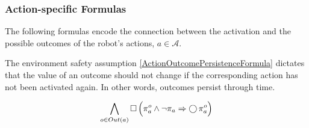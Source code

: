 
\subsubsection{Action-specific Formulas}

The following formulas encode the connection between the activation and the possible outcomes of the robot's actions, $a \in \mathcal{A}$.




The environment safety assumption \eqref{ActionOutcomePersistenceFormula} dictates that the value of an outcome should not change if the corresponding action has not been activated again. 
In other words, outcomes persist through time.

\begin{equation}\label{ActionOutcomePersistenceFormula}
	\bigwedge \limits_{o \in Out(a)} \operatorname{\Box} \Big( \pi_a^o \wedge \lnot \pi_a \Rightarrow \operatorname{\bigcirc} \pi_a^o \Big)
\end{equation}

